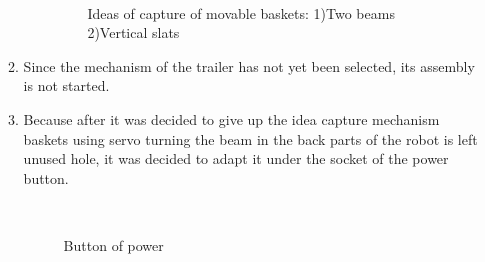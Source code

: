 \begin{enumerate}
\begin{enumerate}
\begin{enumerate}
			\begin{figure}[H]
				\begin{minipage}[h]{0.2\linewidth}
					\center  
				\end{minipage}
				\begin{minipage}[h]{0.6\linewidth}
					\caption{Ideas of capture of movable baskets: 1)Two beams 2)Vertical slats %
						}
				\end{minipage}
			\end{figure}
			
		\end{enumerate}
		
		\item Since the mechanism of the trailer has not yet been selected, its assembly is not started.
		
		\item Because after it was decided to give up the idea capture mechanism baskets using servo turning the beam in the back parts of the robot is left unused hole, it was decided to adapt it under the socket of the power button.
		
		\begin{figure}[H]
			\begin{minipage}[h]{0.2\linewidth}
				\center  
			\end{minipage}
			\begin{minipage}[h]{0.6\linewidth}
				\caption{Button of power}
			\end{minipage}
		\end{figure}
		

\end{enumerate}
\end{enumerate}
